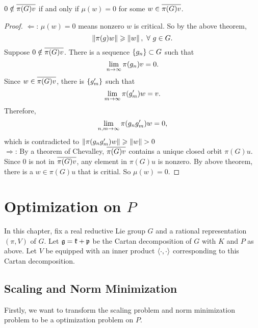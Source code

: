 \documentclass[suri,pdfbookmark]{engsuribt} %
\begin{document}
  \begin{cor}
    $0 \notin \overline{\pi(G)v}$ if and only if $\mu(w) = 0$ for some $w \in \overline{\pi(G)v}$.
  \end{cor}
  \begin{proof}
    $\Leftarrow$: $\mu(w) = 0$ means nonzero $w$ is critical. So by the above theorem,
    \begin{equation*}
      \left\lVert\pi(g)w\right\lVert \geqslant \left\lVert w\right\lVert,~\forall~g \in G.
    \end{equation*}
    Suppose $0 \notin \overline{\pi(G)v}$. There is a sequence $\left\{g_n\right\} \subset G$ such that 
    \begin{equation*}
      \lim_{n \rightarrow \infty} \pi(g_n)v = 0.
    \end{equation*}
    Since $w \in \overline{\pi(G)v}$, there is $\left\{g^{\prime}_m\right\}$ such that
    \begin{equation*}
      \lim_{m \rightarrow \infty} \pi(g^{\prime}_m)w = v.
    \end{equation*}
    Therefore,
    \begin{equation*}
      \lim_{n,m \rightarrow \infty} \pi(g_ng^{\prime}_m)w = 0, 
    \end{equation*}
    which is contradicted to $\left\lVert\pi(g_ng^{\prime}_m)w\right\lVert \geqslant \left\lVert w\right\lVert > 0$\vspace{1em} \\
    $\Rightarrow$: By a theorem of Chevalley, $\overline{\pi(G)v}$ contains a unique closed orbit $\pi(G)u$. Since $0$ is not in $\overline{\pi(G)v}$, any element in $\pi(G)u$ is nonzero. By above theorem, there is a $w \in \pi(G)u$ that is critial. So $\mu(w) = 0$.
  \end{proof}

  \chapter{Optimization on \texorpdfstring{$P$}{P}}

  In this chapter, fix a real reductive Lie group $G$ and a rational representation $(\pi,V)$ of $G$. Let $\mathfrak{g} = \mathfrak{k}+\mathfrak{p}$ be the Cartan decomposition of $G$ with $K$ and $P$ as above. Let $V$ be equipped with an inner product $\left\langle \cdot,\cdot \right\rangle$ corresponding to this Cartan decomposition.

  \section{Scaling and Norm Minimization}

  Firstly, we want to transform the scaling problem and norm minimization problem to be a optimization problem on $P$. 
\end{document}
